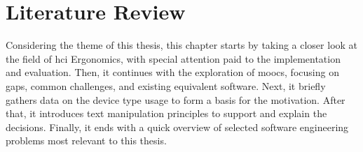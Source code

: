 \chapter{Literature Review}
\label{Literature-Review}

Considering the theme of this thesis, this chapter starts by taking a closer look at the field of \gls{hci} Ergonomics, with special attention paid to the implementation and evaluation.
Then, it continues with the exploration of \glspl{mooc}, focusing on gaps, common challenges, and existing equivalent software.
Next, it briefly gathers data on the device type usage to form a basis for the motivation.
After that, it introduces text manipulation principles to support and explain the decisions.
Finally, it ends with a quick overview of selected software engineering problems most relevant to this thesis.










